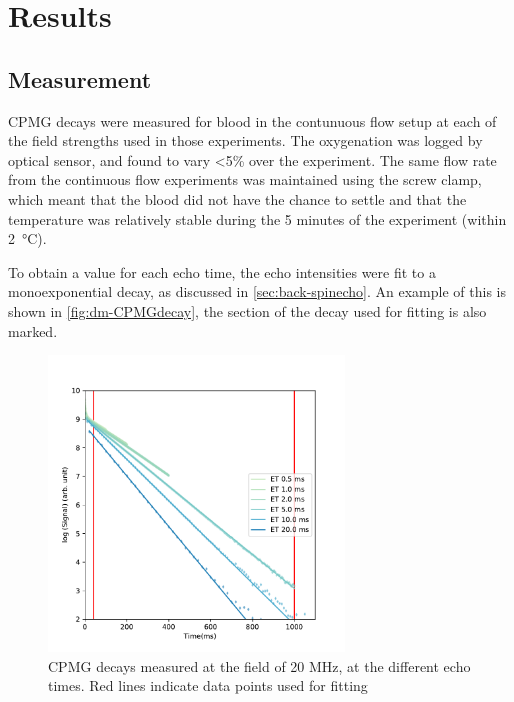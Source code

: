 \section{Results}

\subsection{\Ttwo Measurement}
CPMG decays were measured for blood in the contunuous flow setup at each of the field strengths used in those experiments.
The oxygenation was logged by optical sensor, and found to vary <5\% over the experiment.
The same flow rate from the continuous flow experiments was maintained using the screw clamp, which meant that the blood did not have the chance to settle and that the temperature was relatively stable during the 5 minutes of the experiment (within \SI{2}{\celsius}).

To obtain a \Ttwo value for each echo time, the echo intensities were fit to a monoexponential decay, as discussed in \autoref{sec:back-spinecho}.
An example of this is shown in \autoref{fig:dm-CPMGdecay}, the section of the decay used for fitting is also marked.

\begin{figure}[ht]
\centering
\includegraphics[width=0.7\textwidth]{figures/diffmodels/20MHzT2fit.pdf}

\caption[CPMG decays measured at the field of 20 MHz, at the different echo times.]{CPMG decays measured at the field of 20 MHz, at the different echo times. Red lines indicate data points used for fitting}
\label{fig:dm-CPMGdecay}
\end{figure}

